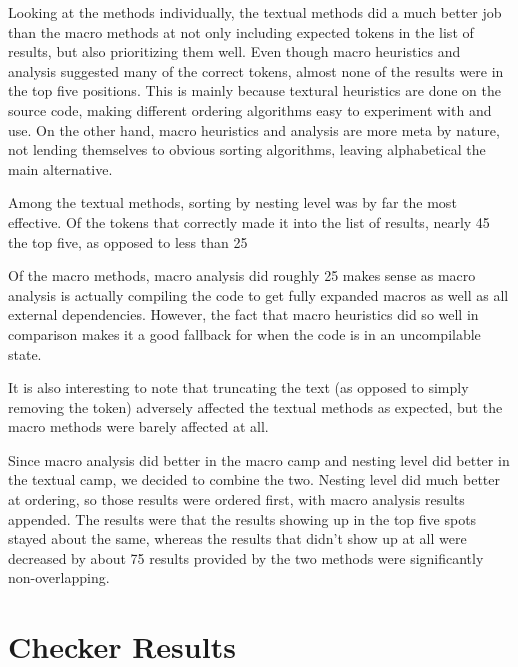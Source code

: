 \documentclass[ms,electronic,twosidetoc,letterpaper,chaptercenter,parttop,lol,lof,lot]{byumsphd}
\begin{document}
Looking at the methods individually, the textual methods did a much better job than the
macro methods at not only including expected tokens in the list of results, but also
prioritizing them well. Even though macro heuristics and analysis suggested many of the
correct tokens, almost none of the results were in the top five positions. This is mainly
because textural heuristics are done on the source code, making different ordering
algorithms easy to experiment with and use. On the other hand, macro heuristics and
analysis are more meta by nature, not lending themselves to obvious sorting algorithms,
leaving alphabetical the main alternative.

Among the textual methods, sorting by nesting level was by far the most effective. Of the
tokens that correctly made it into the list of results, nearly 45%
the top five, as opposed to less than 25%

Of the macro methods, macro analysis did roughly 25%
makes sense as macro analysis is actually compiling the code to get fully expanded macros
as well as all external dependencies. However, the fact that macro heuristics did so well
in comparison makes it a good fallback for when the code is in an uncompilable state.

It is also interesting to note that truncating the text (as opposed to simply removing the
token) adversely affected the textual methods as expected, but the macro methods were
barely affected at all.

Since macro analysis did better in the macro camp and nesting level did better in the
textual camp, we decided to combine the two. Nesting level did much better at ordering, so
those results were ordered first, with macro analysis results appended. The results were
that the results showing up in the top five spots stayed about the same, whereas the
results that didn't show up at all were decreased by about 75%
results provided by the two methods were significantly non-overlapping.

\section{Checker Results}
\end{document}

